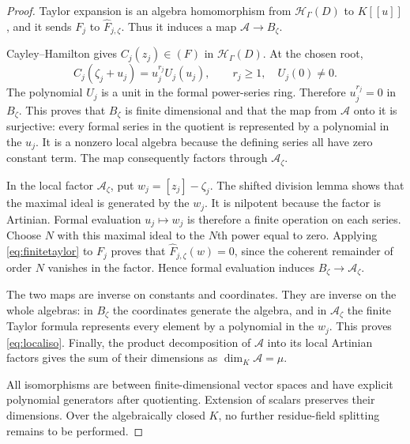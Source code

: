 \documentclass[11pt,letterpaper]{article}
\theoremstyle{definition}
\theoremstyle{remark}
\newcommand{\HH}{\mathcal H}
\newcommand{\Hh}{\HH_{\Gamma}}
\begin{document}
\begin{proof}
Taylor expansion is an algebra homomorphism from $\Hh(D)$ to $K[[u]]$, and it sends $F_j$ to $\widehat F_{j,\zeta}$. Thus it induces a map $\mathcal A\to B_\zeta$.

Cayley--Hamilton gives $C_j(z_j)\in(F)$ in $\Hh(D)$. At the chosen root,
\[
 C_j(\zeta_j+u_j)=u_j^{r_j}U_j(u_j),
 \qquad r_j\geq1,\quad U_j(0)\ne0.
\]
The polynomial $U_j$ is a unit in the formal power-series ring. Therefore $u_j^{r_j}=0$ in $B_\zeta$. This proves that $B_\zeta$ is finite dimensional and that the map from $\mathcal A$ onto it is surjective: every formal series in the quotient is represented by a polynomial in the $u_j$. It is a nonzero local algebra because the defining series all have zero constant term. The map consequently factors through $\mathcal A_\zeta$.

In the local factor $\mathcal A_\zeta$, put $w_j=[z_j]-\zeta_j$. The shifted division lemma shows that the maximal ideal is generated by the $w_j$. It is nilpotent because the factor is Artinian. Formal evaluation $u_j\mapsto w_j$ is therefore a finite operation on each series. Choose $N$ with this maximal ideal to the $N$th power equal to zero. Applying \eqref{eq:finitetaylor} to $F_j$ proves that $\widehat F_{j,\zeta}(w)=0$, since the coherent remainder of order $N$ vanishes in the factor. Hence formal evaluation induces $B_\zeta\to\mathcal A_\zeta$.

The two maps are inverse on constants and coordinates. They are inverse on the whole algebras: in $B_\zeta$ the coordinates generate the algebra, and in $\mathcal A_\zeta$ the finite Taylor formula represents every element by a polynomial in the $w_j$. This proves \eqref{eq:localiso}. Finally, the product decomposition of $\mathcal A$ into its local Artinian factors gives the sum of their dimensions as $\dim_K\mathcal A=\mu$.

All isomorphisms are between finite-dimensional vector spaces and have explicit polynomial generators after quotienting. Extension of scalars preserves their dimensions. Over the algebraically closed $K$, no further residue-field splitting remains to be performed.
\end{proof}
\end{document}
